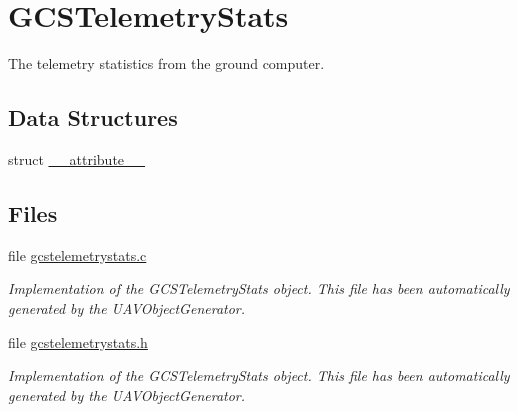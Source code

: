 \hypertarget{group___g_c_s_telemetry_stats}{\section{\-G\-C\-S\-Telemetry\-Stats}
\label{group___g_c_s_telemetry_stats}
}


\-The telemetry statistics from the ground computer.  


\subsection*{\-Data \-Structures}
\begin{DoxyCompactItemize}
\item 
struct \hyperlink{struct____attribute____}{\-\_\-\-\_\-attribute\-\_\-\-\_\-}
\end{DoxyCompactItemize}
\subsection*{\-Files}
\begin{DoxyCompactItemize}
\item 
file \hyperlink{gcstelemetrystats_8c}{gcstelemetrystats.\-c}
\begin{DoxyCompactList}\small\item\em \-Implementation of the \-G\-C\-S\-Telemetry\-Stats object. \-This file has been automatically generated by the \-U\-A\-V\-Object\-Generator. \end{DoxyCompactList}\item 
file \hyperlink{gcstelemetrystats_8h}{gcstelemetrystats.\-h}
\begin{DoxyCompactList}\small\item\em \-Implementation of the \-G\-C\-S\-Telemetry\-Stats object. \-This file has been automatically generated by the \-U\-A\-V\-Object\-Generator. \end{DoxyCompactList}\end{DoxyCompactItemize}
